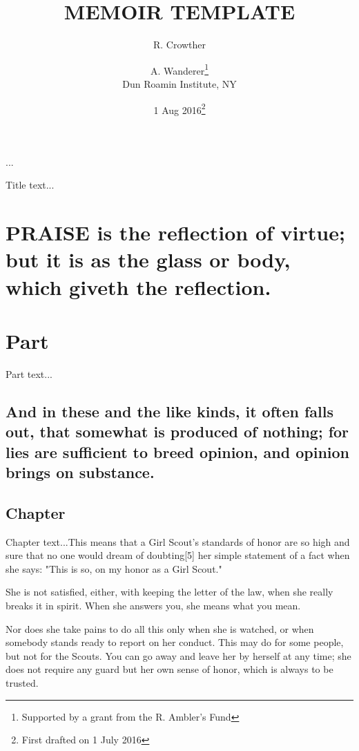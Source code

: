 \documentclass[a4paper, 12pt]{memoir}
\begin{document}
\title{MEMOIR TEMPLATE}
\author{R. Crowther \and
A. Wanderer\thanks{Supported by a grant from the
R. Ambler’s Fund}\\
Dun Roamin Institute, NY}
\date{1 Aug 2016\thanks{First drafted on 1 July 2016}}
...
\maketitle

\frontmatter
\mainmatter



Title text...

\part{ PRAISE is the reflection of virtue; but it is as the glass or body, which giveth the reflection. }
\part{ Part } 
Part text...

\chapter*{ And in these and the like kinds, it often falls out, that somewhat is produced of nothing; for lies are sufficient to breed opinion, and opinion brings on substance. } 
\chapter*{ Chapter } 
Chapter text...This means that a Girl Scout's standards of honor are so high and sure that no one would dream of doubting[5] her simple statement of a fact when she says: "This is so, on my honor as a Girl Scout."

She is not satisfied, either, with keeping the letter of the law, when she really breaks it in spirit. When she answers you, she means what you mean.

Nor does she take pains to do all this only when she is watched, or when somebody stands ready to report on her conduct. This may do for some people, but not for the Scouts. You can go away and leave her by herself at any time; she does not require any guard but her own sense of honor, which is always to be trusted.
\end{document}
